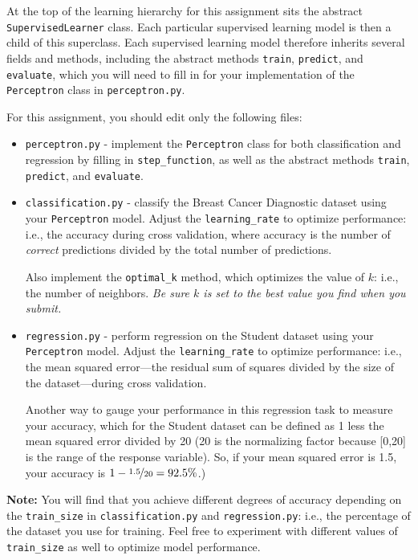 \documentclass{article}
\begin{document}
At the top of the learning hierarchy for this assignment sits the abstract \verb|SupervisedLearner| class.
Each particular supervised learning model is then a child of this superclass.
Each supervised learning model therefore inherits several fields and methods,
including the abstract methods \verb|train|, \verb|predict|, and \verb|evaluate|,
which you will need to fill in for your implementation of the \verb|Perceptron| class in \verb|perceptron.py|.
\fi

For this assignment, you should edit only the following files:

\begin{itemize}
\item \verb|perceptron.py| - implement the \verb|Perceptron| class for both classification and regression by filling in
  \verb|step_function|, as well as the abstract methods \verb|train|, \verb|predict|, and \verb|evaluate|.

\item \verb|classification.py| - classify the Breast Cancer Diagnostic dataset using your \verb|Perceptron| model.
  Adjust the \verb|learning_rate| to optimize performance: i.e., the accuracy during cross validation,
  where accuracy is the number of \emph{correct\/} predictions divided by the total number of predictions.

  Also implement the \verb|optimal_k| method, which optimizes the value of $k$: i.e., the number of neighbors.
  \emph{Be sure $k$ is set to the best value you find when you submit.}

\item \verb|regression.py| - perform regression on the Student dataset using your \verb|Perceptron| model.
  Adjust the \verb|learning_rate| to optimize performance: i.e., the mean squared error---the
  residual sum of squares divided by the size of the dataset---during cross validation.

  Another way to gauge your performance in this regression task to measure your accuracy,
  which for the Student dataset can be defined as 1 less the mean squared error divided by 20
  (20 is the normalizing factor because [0,20] is the range of the response variable).
  So, if your mean squared error is 1.5, your accuracy is $1 - \nicefrac{1.5}{20} = 92.5\%$.)
\end{itemize}

\textbf{Note:} You will find that you achieve different degrees of accuracy
depending on the \verb|train_size| in \verb|classification.py| and \verb|regression.py|:
i.e., the percentage of the dataset you use for training.
Feel free to experiment with different values of \verb|train_size| as well to optimize model performance.
\end{document}
